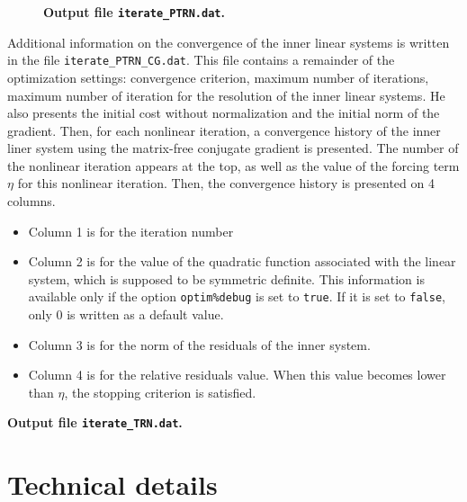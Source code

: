 \documentclass[a4paper,twoside,final,onecolumn,11pt,openright]{article}
\begin{document}
\begin{figure}
\tiny
 
\normalsize
\begin{center}
\textbf{Output file \texttt{iterate\_PTRN.dat}.} 
\end{center} 
\end{figure}


Additional information on the convergence of the inner linear systems is written in the file \texttt{iterate\_PTRN\_CG.dat}. This file contains a remainder of the optimization settings: convergence criterion, maximum number of iterations, maximum number of iteration for the resolution of the inner linear systems. He also presents the initial cost without normalization and the initial norm of the gradient. Then, for each nonlinear iteration, a convergence history of the inner liner system using the matrix-free conjugate gradient is presented. The number of the nonlinear iteration appears at the top, as well as the value of the forcing term $\eta$ for this nonlinear iteration. Then, the convergence history is presented on 4 columns. 
\begin{itemize}
\item Column 1 is for the iteration number
\item Column 2 is for the value of the quadratic function associated with the linear system, which is supposed to be symmetric definite. This information is available only if the option \texttt{optim\%debug} is set to \texttt{true}. If it is set to \texttt{false}, only $0$ is written as a default value. 
\item Column 3 is for the norm of the residuals of the inner system. 
\item Column 4 is for the relative residuals value. When this value becomes lower than $\eta$, the stopping criterion is satisfied. 
\end{itemize}

\tiny
 
\normalsize
\begin{center}
\textbf{Output file \texttt{iterate\_TRN.dat}.} 
\end{center}


\newpage
\section{Technical details}
\end{document}

